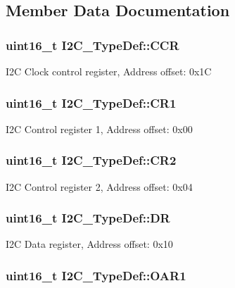 \subsection{Member Data Documentation}
\hypertarget{struct_i2_c___type_def_a1775e779008da2b4d1807c2b5033b8a5}{
\subsubsection[{C\-C\-R}]{ uint16\-\_\-t I2\-C\-\_\-\-Type\-Def\-::\-C\-C\-R}}\label{struct_i2_c___type_def_a1775e779008da2b4d1807c2b5033b8a5}
I2\-C Clock control register, Address offset\-: 0x1\-C \hypertarget{struct_i2_c___type_def_ad35ea0b199cefb757de20e9b78168534}{
\subsubsection[{C\-R1}]{ uint16\-\_\-t I2\-C\-\_\-\-Type\-Def\-::\-C\-R1}}\label{struct_i2_c___type_def_ad35ea0b199cefb757de20e9b78168534}
I2\-C Control register 1, Address offset\-: 0x00 \hypertarget{struct_i2_c___type_def_ac8bff45acc455489620d50e697a24c9d}{
\subsubsection[{C\-R2}]{ uint16\-\_\-t I2\-C\-\_\-\-Type\-Def\-::\-C\-R2}}\label{struct_i2_c___type_def_ac8bff45acc455489620d50e697a24c9d}
I2\-C Control register 2, Address offset\-: 0x04 \hypertarget{struct_i2_c___type_def_a5c1551b886fbb8e801b9203f6d7dc7c5}{
\subsubsection[{D\-R}]{ uint16\-\_\-t I2\-C\-\_\-\-Type\-Def\-::\-D\-R}}\label{struct_i2_c___type_def_a5c1551b886fbb8e801b9203f6d7dc7c5}
I2\-C Data register, Address offset\-: 0x10 \hypertarget{struct_i2_c___type_def_ad218fdcb9606477c1d63f8ee38d3c5c9}{
\subsubsection[{O\-A\-R1}]{ uint16\-\_\-t I2\-C\-\_\-\-Type\-Def\-::\-O\-A\-R1}}\label{struct_i2_c___type_def_ad218fdcb9606477c1d63f8ee38d3c5c9}
